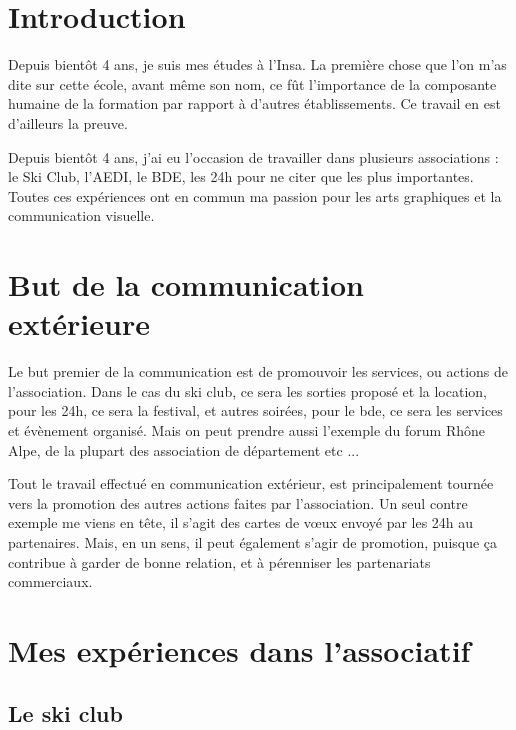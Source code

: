 
\section {Introduction}

    Depuis bientôt 4 ans, je suis mes études à l'Insa.
    La première chose que l'on m'as dite sur cette école, avant même son nom, ce fût l'importance de la composante humaine de la formation par rapport à d'autres établissements. Ce travail en est d'ailleurs la preuve.

    Depuis bientôt 4 ans, j'ai eu l'occasion de travailler dans plusieurs associations : le Ski Club, l'AEDI, le BDE, les 24h pour ne citer que les plus importantes.
    Toutes ces expériences ont en commun ma passion pour les arts graphiques et la communication visuelle.

        
    
\section{But de la communication extérieure}

    Le but premier de la communication est de promouvoir les services, ou actions de l'association.
    Dans le cas du ski club, ce sera les sorties proposé et la location, pour les 24h, ce sera la festival, et autres soirées, pour le bde, ce sera les services et évènement organisé.
    Mais on peut prendre aussi l'exemple du forum Rhône Alpe, de la plupart des association de département etc ...

    Tout le travail effectué en communication extérieur, est principalement tournée vers la promotion des autres actions faites par l'association.
    Un seul contre exemple me viens en tête, il s'agit des cartes de vœux envoyé par les 24h au partenaires.
    Mais, en un sens, il peut également s'agir de promotion, puisque ça contribue à garder de bonne relation, et à pérenniser les partenariats commerciaux.


\section{Mes expériences dans l'associatif}

    \subsection{Le ski club}
        
